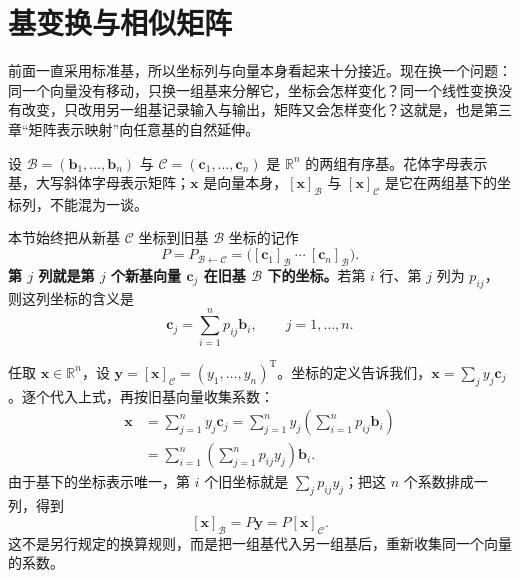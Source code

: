 \documentclass[a4paper,12pt,twoside,openany,fontset=none]{ctexbook}
\let\oldsum\sum
\renewcommand{\sum}{\displaystyle\oldsum}
\numberwithin{equation}{chapter}
\begin{document}
\section{基变换与相似矩阵}
\label{sec:four-basis-similarity}

前面一直采用标准基，所以坐标列与向量本身看起来十分接近。现在换一个问题：同一个向量没有移动，只换一组基来分解它，坐标会怎样变化？同一个线性变换没有改变，只改用另一组基记录输入与输出，矩阵又会怎样变化？这就是，也是第三章“矩阵表示映射”向任意基的自然延伸。

设 $\mathcal B=(\boldsymbol b_1,\ldots,\boldsymbol b_n)$ 与 $\mathcal C=(\boldsymbol c_1,\ldots,\boldsymbol c_n)$ 是 $\mathbb R^n$ 的两组有序基。花体字母表示基，大写斜体字母表示矩阵；$\boldsymbol x$ 是向量本身，$[\boldsymbol x]_{\mathcal B}$ 与 $[\boldsymbol x]_{\mathcal C}$ 是它在两组基下的坐标列，不能混为一谈。

本节始终把从新基 $\mathcal C$ 坐标到旧基 $\mathcal B$ 坐标的记作
\begin{equation}
 P=P_{\mathcal B\leftarrow\mathcal C}
 =\bigl([\boldsymbol c_1]_{\mathcal B}\ \cdots\ [\boldsymbol c_n]_{\mathcal B}\bigr).
 \label{eq:four-transition-columns}
\end{equation}
\textbf{第 $j$ 列就是第 $j$ 个新基向量 $\boldsymbol c_j$ 在旧基 $\mathcal B$ 下的坐标。}若第 $i$ 行、第 $j$ 列为 $p_{ij}$，则这列坐标的含义是
\begin{equation}
 \boldsymbol c_j=\sum_{i=1}^n p_{ij}\boldsymbol b_i,\qquad j=1,\ldots,n.
\end{equation}

任取 $\boldsymbol x\in\mathbb R^n$，设 $\boldsymbol y=[\boldsymbol x]_{\mathcal C}=(y_1,\ldots,y_n)^{\mathrm T}$。坐标的定义告诉我们，$\boldsymbol x=\sum_j y_j\boldsymbol c_j$。逐个代入上式，再按旧基向量收集系数：
\begin{align}
 \boldsymbol x
 &=\sum_{j=1}^n y_j\boldsymbol c_j
 =\sum_{j=1}^n y_j\left(\sum_{i=1}^n p_{ij}\boldsymbol b_i\right)\\
 &=\sum_{i=1}^n\left(\sum_{j=1}^n p_{ij}y_j\right)\boldsymbol b_i.
\end{align}
由于基下的坐标表示唯一，第 $i$ 个旧坐标就是 $\sum_j p_{ij}y_j$；把这 $n$ 个系数排成一列，得到
\begin{equation}
 \boxed{[\boldsymbol x]_{\mathcal B}=P\boldsymbol y
 =P[\boldsymbol x]_{\mathcal C}.}
 \label{eq:four-coordinate-change}
\end{equation}
这不是另行规定的换算规则，而是把一组基代入另一组基后，重新收集同一个向量的系数。
\end{document}
